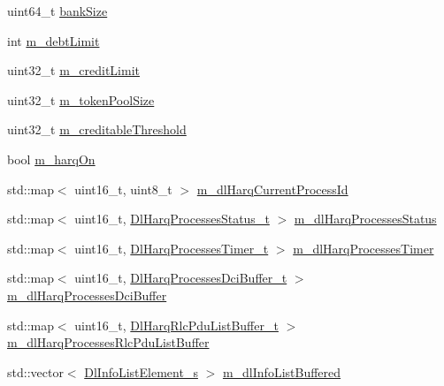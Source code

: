 \begin{DoxyCompactItemize}
\item 
uint64\+\_\+t \hyperlink{classns3_1_1FdTbfqFfMacScheduler_a2e499981c641859beb7ae48a0c343ba1}{bank\+Size}
\item 
int \hyperlink{classns3_1_1FdTbfqFfMacScheduler_aa73b1800df86289d9a1fc49886c9a175}{m\+\_\+debt\+Limit}
\item 
uint32\+\_\+t \hyperlink{classns3_1_1FdTbfqFfMacScheduler_aa390b2d541c6190fd44f6457fe006a38}{m\+\_\+credit\+Limit}
\item 
uint32\+\_\+t \hyperlink{classns3_1_1FdTbfqFfMacScheduler_a0f729f9c65abdbcd28f36269f501fe14}{m\+\_\+token\+Pool\+Size}
\item 
uint32\+\_\+t \hyperlink{classns3_1_1FdTbfqFfMacScheduler_a581771a634fa44e3e817131accd9db1f}{m\+\_\+creditable\+Threshold}
\item 
bool \hyperlink{classns3_1_1FdTbfqFfMacScheduler_afb4bf57d3b17b967f82a5b2134cd70e7}{m\+\_\+harq\+On}
\item 
std\+::map$<$ uint16\+\_\+t, uint8\+\_\+t $>$ \hyperlink{classns3_1_1FdTbfqFfMacScheduler_a62be9c7aa20ef5d6994f9aa927f73858}{m\+\_\+dl\+Harq\+Current\+Process\+Id}
\item 
std\+::map$<$ uint16\+\_\+t, \hyperlink{namespacens3_a457b3571b67ff17d042e9894e90e2ce2}{Dl\+Harq\+Processes\+Status\+\_\+t} $>$ \hyperlink{classns3_1_1FdTbfqFfMacScheduler_abc7e2984f379ab5a1855d815c439fa4f}{m\+\_\+dl\+Harq\+Processes\+Status}
\item 
std\+::map$<$ uint16\+\_\+t, \hyperlink{namespacens3_a39413ade536de4b1c82d6c0074cc703e}{Dl\+Harq\+Processes\+Timer\+\_\+t} $>$ \hyperlink{classns3_1_1FdTbfqFfMacScheduler_ae7a4cdc82a971f39b2238c472ceedf62}{m\+\_\+dl\+Harq\+Processes\+Timer}
\item 
std\+::map$<$ uint16\+\_\+t, \hyperlink{namespacens3_af25599bf8f9f564075c005759c9af18c}{Dl\+Harq\+Processes\+Dci\+Buffer\+\_\+t} $>$ \hyperlink{classns3_1_1FdTbfqFfMacScheduler_a3b740ad89004ff0fce4d87eea57508e5}{m\+\_\+dl\+Harq\+Processes\+Dci\+Buffer}
\item 
std\+::map$<$ uint16\+\_\+t, \hyperlink{namespacens3_a4c0cbd1e72f1c667f8b5879655f13210}{Dl\+Harq\+Rlc\+Pdu\+List\+Buffer\+\_\+t} $>$ \hyperlink{classns3_1_1FdTbfqFfMacScheduler_ac885f8c49550f861905b5e790e346d7b}{m\+\_\+dl\+Harq\+Processes\+Rlc\+Pdu\+List\+Buffer}
\item 
std\+::vector$<$ \hyperlink{structns3_1_1DlInfoListElement__s}{Dl\+Info\+List\+Element\+\_\+s} $>$ \hyperlink{classns3_1_1FdTbfqFfMacScheduler_a72f4bdca7a08fcc26b1618bb9e2d0cf3}{m\+\_\+dl\+Info\+List\+Buffered}

\end{DoxyCompactItemize}
